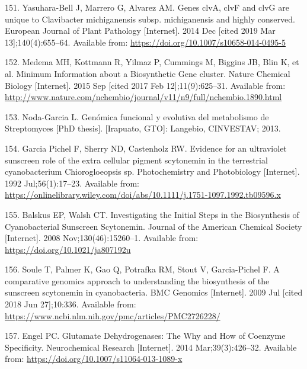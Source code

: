 \documentclass[12pt,twoside]{reedthesis}
\begin{document}
  \hypertarget{ref-yasuhara-bell_genes_2014}{}
  151. Yasuhara-Bell J, Marrero G, Alvarez AM. Genes clvA, clvF and clvG
  are unique to Clavibacter michiganensis subsp. michiganensis and highly
  conserved. European Journal of Plant Pathology {[}Internet{]}. 2014 Dec
  {[}cited 2019 Mar 13{]};140(4):655--64. Available from:
  \url{https://doi.org/10.1007/s10658-014-0495-5}
  
  \hypertarget{ref-medema_minimum_2015}{}
  152. Medema MH, Kottmann R, Yilmaz P, Cummings M, Biggins JB, Blin K, et
  al. Minimum Information about a Biosynthetic Gene cluster. Nature
  Chemical Biology {[}Internet{]}. 2015 Sep {[}cited 2017 Feb
  12{]};11(9):625--31. Available from:
  \url{http://www.nature.com/nchembio/journal/v11/n9/full/nchembio.1890.html}
  
  \hypertarget{ref-cruz_tesis_2013}{}
  153. Noda-Garcia L. Genómica funcional y evolutiva del metabolismo de
  Streptomyces {[}PhD thesis{]}. {[}Irapuato, GTO{]}: Langebio, CINVESTAV;
  2013.
  
  \hypertarget{ref-garciapichel_evidence_1992}{}
  154. Garcia Pichel F, Sherry ND, Castenholz RW. Evidence for an
  ultraviolet sunscreen role of the extra cellular pigment scytonemin in
  the terrestrial cyanobacterium Chiorogloeopsis sp. Photochemistry and
  Photobiology {[}Internet{]}. 1992 Jul;56(1):17--23. Available from:
  \url{https://onlinelibrary.wiley.com/doi/abs/10.1111/j.1751-1097.1992.tb09596.x}
  
  \hypertarget{ref-balskus_investigating_2008}{}
  155. Balskus EP, Walsh CT. Investigating the Initial Steps in the
  Biosynthesis of Cyanobacterial Sunscreen Scytonemin. Journal of the
  American Chemical Society {[}Internet{]}. 2008 Nov;130(46):15260--1.
  Available from: \url{https://doi.org/10.1021/ja807192u}
  
  \hypertarget{ref-soule_comparative_2009}{}
  156. Soule T, Palmer K, Gao Q, Potrafka RM, Stout V, Garcia-Pichel F. A
  comparative genomics approach to understanding the biosynthesis of the
  sunscreen scytonemin in cyanobacteria. BMC Genomics {[}Internet{]}. 2009
  Jul {[}cited 2018 Jun 27{]};10:336. Available from:
  \url{https://www.ncbi.nlm.nih.gov/pmc/articles/PMC2726228/}
  
  \hypertarget{ref-engel_glutamate_2014}{}
  157. Engel PC. Glutamate Dehydrogenases: The Why and How of Coenzyme
  Specificity. Neurochemical Research {[}Internet{]}. 2014
  Mar;39(3):426--32. Available from:
  \url{https://doi.org/10.1007/s11064-013-1089-x}
  
\end{document}
